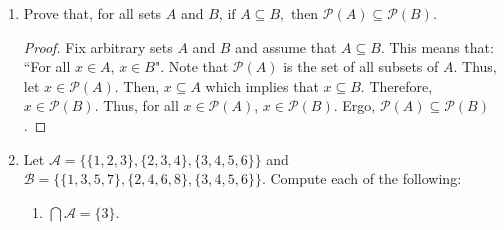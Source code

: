 \documentclass{article}
\begin{document}
\begin{enumerate}
\begin{enumerate}
\begin{proof}
\begin{enumerate}
                                    \quad\emph{Case 4:} Assume $x \in A \cap C$. Then, $x \in A$ and $x \in C$. Since, $x \in C$, $x \in B \cup C$. Thus, $x \in A \cap (B \cup C)$.
                            \end{enumerate}
                        \end{proof}

    			\item Prove (16): For all sets $A$, $B$, and $C$, if $A \subseteq B$ and $B \subseteq C$, then $A \subseteq C$.
                        \begin{proof}
                            Fix arbitrary sets $A$, $B$, and $C$ and assume $A \subseteq B$ and $B \subseteq C$. This means that: ``For all $x \in A$, $x \in B$" and ``For all $x \in B$, $x \in C$." Therefore, if $x \in A$, $x \in B$. Following that, if $x \in B$, $x \in C$. Thus, for all $x \in A$, $x \in C$. Thus, $A \subseteq C$.
                        \end{proof}
    		\end{enumerate}

    	\item Prove that, for all sets $A$ and $B$, $\text{if } A \subseteq B, \text{ then } \mathcal{P}(A) \subseteq \mathcal{P}(B)$.
                \begin{proof}
                    Fix arbitrary sets $A$ and $B$ and assume that $A \subseteq B$. This means that: ``For all $x \in A$, $x \in B$". Note that $\mathcal{P}(A)$ is the set of all subsets of $A$. Thus, let $x \in \mathcal{P}(A)$. Then, $x \subseteq A$ which implies that $x \subseteq B$. Therefore, $x \in \mathcal{P}(B)$. Thus, for all $x \in \mathcal{P}(A)$, $x \in \mathcal{P}(B)$. Ergo, $\mathcal{P}(A) \subseteq \mathcal{P}(B)$.
                \end{proof}

    	\item Let $\mathcal{A} = \{ \{ 1, 2, 3 \}, \{ 2, 3, 4 \}, \{ 3, 4, 5, 6 \} \}$ and $\mathcal{B} = \{ \{ 1, 3, 5, 7 \}, \{ 2, 4, 6, 8 \}, \{ 3,          4, 5, 6 \} \}$.
    		Compute each of the following:
    		\begin{enumerate}

    			\item $\displaystyle \bigcap \mathcal{A} = \{ 3 \}$.


\end{enumerate}
\end{enumerate}
\end{document}
